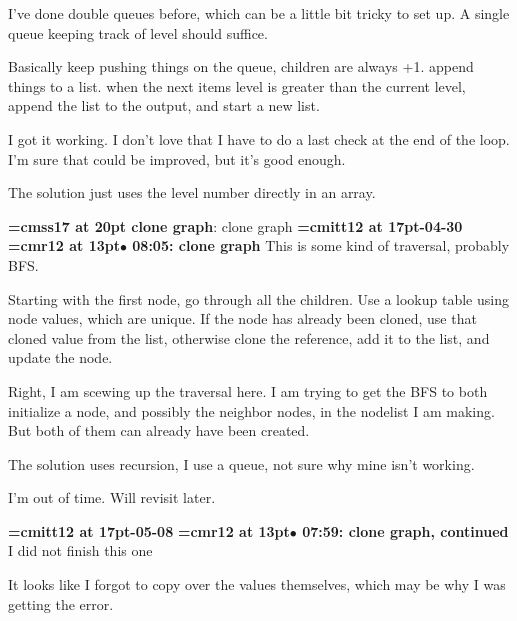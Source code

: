 I've done double queues before, which can be a little bit tricky to set up. A single queue keeping track of level should suffice.
\par

Basically keep pushing things on the queue, children are always +1. append things to a list. when the next items level is greater than the current level, append the list to the output, and start a new list.
\par

I got it working. I don't love that I have to do a last check at the end of the loop. I'm sure that could be improved, but it's good enough.
\par

The solution just uses the level number directly in an array.
\par

{\medskip\noindent\bf\font\titlefont=cmss17 at 20pt clone graph}: clone graph
{\medskip\noindent\bf\font\titlefont=cmitt12 at 17pt-04-30}\medskip
{\smallskip\noindent\bf\font\titlefont=cmr12 at 13pt\titlefont $\bullet$ 08:05: clone graph}\smallskip
This is some kind of traversal, probably BFS.
\par

Starting with the first node, go through all the children. Use a lookup table using node values, which are unique. If the node has already been cloned, use that cloned value from the list, otherwise clone the reference, add it to the list, and update the node.
\par

Right, I am scewing up the traversal here. I am trying to get the BFS to both initialize a node, and possibly the neighbor nodes, in the nodelist I am making. But both of them can already have been created.
\par

The solution uses recursion, I use a queue, not sure why mine isn't working.
\par

I'm out of time. Will revisit later.
\par

{\medskip\noindent\bf\font\titlefont=cmitt12 at 17pt-05-08}\medskip
{\smallskip\noindent\bf\font\titlefont=cmr12 at 13pt\titlefont $\bullet$ 07:59: clone graph, continued}\smallskip
I did not finish this one
\par

It looks like I forgot to copy over the values themselves, which may be why I was getting the error.
\par

